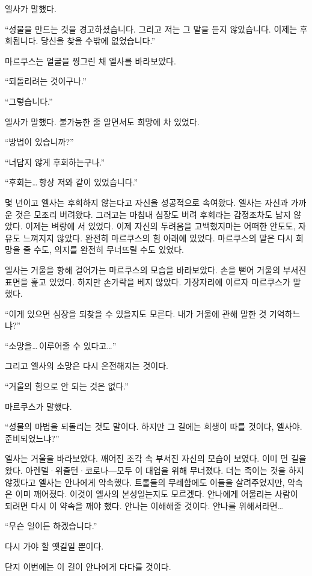 엘사가 말했다.

``성물을 만드는 것을 경고하셨습니다. 그리고 저는 그 말을 듣지 않았습니다. 이제는 후회됩니다. 당신을 찾을 수밖에 없었습니다.''

마르쿠스는 얼굴을 찡그린 채 엘사를 바라보았다.

``되돌리려는 것이구나.''

``그렇습니다.''

엘사가 말했다. 불가능한 줄 알면서도 희망에 차 있었다.

``방법이 있습니까?''

``너답지 않게 후회하는구나.''

``후회는\ldots\,항상 저와 같이 있었습니다.''

몇 년이고 엘사는 후회하지 않는다고 자신을 성공적으로 속여왔다. 엘사는 자신과 가까운 것은 모조리 버려왔다. 그러고는 마침내 심장도 버려 후회라는 감정조차도 남지 않았다. 이제는 벼랑에 서 있었다. 이제 자신의 두려움을 고백했지마는 어떠한 안도도, 자유도 느껴지지 않았다. 완전히 마르쿠스의 힘 아래에 있었다. 마르쿠스의 말은 다시 희망을 줄 수도, 의지를 완전히 무너뜨릴 수도 있었다.

엘사는 거울을 향해 걸어가는 마르쿠스의 모습을 바라보았다. 손을 뻗어 거울의 부서진 표면을 훑고 있었다. 하지만 손가락을 베지 않았다. 가장자리에 이르자 마르쿠스가 말했다.

``이게 있으면 심장을 되찾을 수 있을지도 모른다. 내가 거울에 관해 말한 것 기억하느냐?''

``소망을\ldots\,이루어줄 수 있다고\ldots''

그리고 엘사의 소망은 다시 온전해지는 것이다.

``거울의 힘으로 안 되는 것은 없다.''

마르쿠스가 말했다.

``성물의 마법을 되돌리는 것도 말이다. 하지만 그 길에는 희생이 따를 것이다, 엘사야. 준비되었느냐?''

엘사는 거울을 바라보았다. 깨어진 조각 속 부서진 자신의 모습이 보였다. 이미 먼 길을 왔다. 아렌델·위즐턴·코로나—모두 이 대업을 위해 무너졌다. 더는 죽이는 것을 하지 않겠다고 엘사는 안나에게 약속했다. 트롤들의 무례함에도 이들을 살려주었지만, 약속은 이미 깨어졌다. 이것이 엘사의 본성일는지도 모르겠다. 안나에게 어울리는 사람이 되려면 다시 이 약속을 깨야 했다. 안나는 이해해줄 것이다. 안나를 위해서라면\ldots

``무슨 일이든 하겠습니다.''

다시 가야 할 옛길일 뿐이다.

단지 이번에는 이 길이 안나에게 다다를 것이다.

